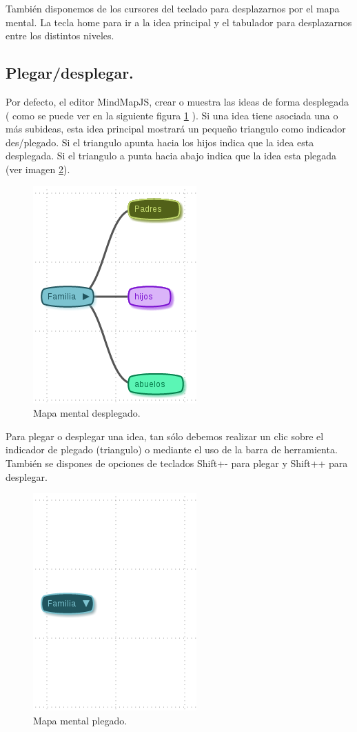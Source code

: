 También disponemos de los cursores del teclado para desplazarnos por el mapa mental. La tecla home para ir a la idea principal y el tabulador para desplazarnos entre los distintos niveles.

\subsection{Plegar/desplegar.}

Por defecto, el editor MindMapJS, crear o muestra las ideas de forma desplegada ( como se puede ver en la siguiente figura \ref{fig:MM-desplegado} ). Si una idea tiene asociada una o más subideas, esta idea principal mostrará un pequeño triangulo como indicador des/plegado. Si el triangulo apunta hacia los hijos indica que la idea esta desplegada. Si el triangulo a punta hacia abajo indica que la idea esta plegada (ver imagen \ref{fig:MM-plegado}).  

\begin{figure}[tbph]
\centering
\includegraphics[width=0.3\linewidth]{imagenes/MM-desplegado.png}
\caption{Mapa mental desplegado.}
\label{fig:MM-desplegado}
\end{figure}

Para plegar o desplegar una idea, tan sólo debemos realizar un clic sobre el indicador de plegado (triangulo) o mediante el uso de la barra de herramienta. También se dispones de opciones de teclados Shift+- para plegar y Shift++ para desplegar. 

\begin{figure}[tbph]
\centering
\includegraphics[width=0.3\linewidth]{imagenes/MM-plegado.png}
\caption{Mapa mental plegado.}
\label{fig:MM-plegado}
\end{figure}



